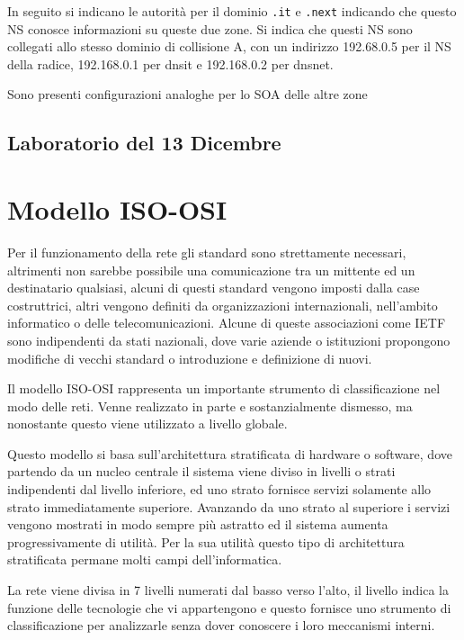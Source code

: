 \documentclass{article}
\numberwithin{equation}{subsection}
\begin{document}
In seguito si indicano le autorità per il dominio \texttt{.it} e \texttt{.next} indicando che questo NS conosce informazioni su queste due zone. 
Si indica che questi NS sono collegati allo stesso dominio di collisione A, con un indirizzo 192.68.0.5 per il NS della radice, 192.168.0.1 per 
dnsit e 192.168.0.2 per dnsnet. 

Sono presenti configurazioni analoghe per lo SOA delle altre zone %

\subsection{Laboratorio del 13 Dicembre}



\clearpage

\section{Modello ISO-OSI}

Per il funzionamento della rete gli standard sono strettamente necessari, altrimenti non sarebbe possibile una comunicazione tra un mittente ed un destinatario qualsiasi, 
alcuni di questi standard vengono imposti dalla case costruttrici, altri vengono definiti da organizzazioni internazionali, nell'ambito informatico o delle 
telecomunicazioni. Alcune di queste associazioni come IETF sono indipendenti da stati nazionali, dove varie aziende o istituzioni propongono modifiche di vecchi 
standard o introduzione e definizione di nuovi. 

Il modello ISO-OSI rappresenta un importante strumento di classificazione nel modo delle reti. Venne realizzato in parte e sostanzialmente dismesso, ma nonostante 
questo viene utilizzato a livello globale. 

Questo modello si basa sull'architettura stratificata di hardware o software, dove partendo da un nucleo centrale il sistema viene diviso in livelli o strati 
indipendenti dal livello inferiore, ed uno strato fornisce servizi solamente allo strato immediatamente superiore. Avanzando da uno strato al superiore i servizi vengono mostrati in modo 
sempre più astratto ed il sistema aumenta progressivamente di utilità. Per la sua utilità questo tipo di architettura stratificata permane molti campi dell'informatica. 

La rete viene divisa in 7 livelli numerati dal basso verso l'alto, il livello indica la funzione delle tecnologie che vi appartengono e questo fornisce uno strumento di 
classificazione per analizzarle senza dover conoscere i loro meccanismi interni. 
\end{document}
